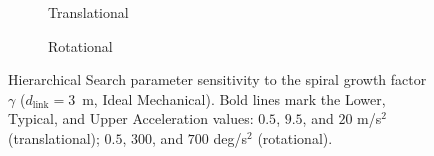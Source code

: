 \documentclass[fleqn,10pt]{wlscirep}
\newcommand{\rev}[1]{{\color{revblue}#1}}
\begin{document}
\begin{figure}[ht!]
    \centering
    \begin{subfigure}{0.495\linewidth}
        
        \vspace{-25pt}
        \caption{Translational}
        \label{fig:tuning_hs_trans}
    \end{subfigure}
    \hfill
    \begin{subfigure}{0.495\linewidth}
        
        \vspace{-25pt}
        \caption{Rotational}
        \label{fig:tuning_hs_rot}
    \end{subfigure}
    \caption{\rev{Hierarchical Search parameter sensitivity to the spiral growth factor $\gamma$ ($d_{\text{link}} = 3$~m, Ideal Mechanical). Bold lines mark the Lower, Typical, and Upper Acceleration values: $0.5$, $9.5$, and $20$ m/s$^2$ (translational); $0.5$, $300$, and $700$ deg/s$^2$ (rotational).}}
    \label{fig:tuning_hs}
    \vspace{-5pt}
\end{figure}
\end{document}
